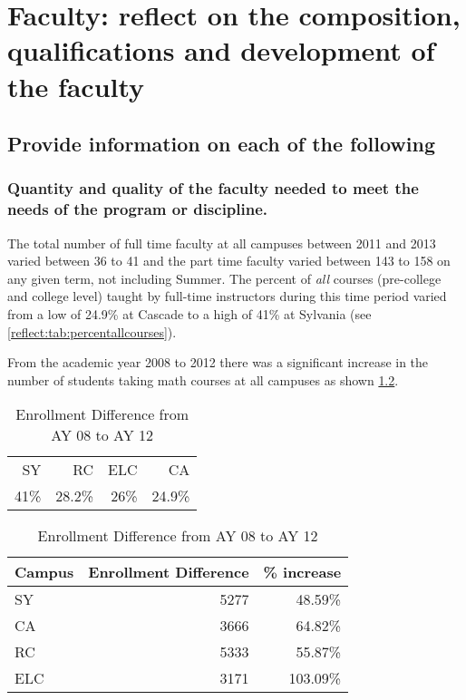 \chapter[Faculty composition and qualifications]{Faculty:  reflect on the composition, qualifications and development of the faculty}
\section{Provide information on each of the following}
\subsection{Quantity and quality of the faculty needed to meet the needs of the program or discipline.}
The total number of full time faculty at all campuses between 2011 and 2013 varied between 36 to 41 and the 
part time faculty varied between 143 to 158 on any given term,  not including Summer.     The percent of \emph{all} courses (pre-college and college level) taught by full-time instructors during this time period varied from a low of 24.9\% at Cascade to a high of 41\% at Sylvania (see \cref{reflect:tab:percentallcourses}).

From the academic year 2008 to 2012 there was a significant increase in the number of students taking math courses at all campuses as shown \cref{reflect:tab:enrollment}. 
\begin{table}[!htb]
  \begin{widepage}
	\begin{minipage}[t]{.4\textwidth}
		\centering
		\caption{Percentage of courses taught by full-time faculty from Summer2011--2013}
		\label{reflect:tab:percentallcourses}
		\begin{tabular}{rrrr}
			\toprule
			SY   & RC     & ELC  & CA     \\    
			41\% & 28.2\% & 26\% & 24.9\% \\
			\bottomrule
		\end{tabular}
	\end{minipage}%
	\begin{minipage}[t]{.6\textwidth}
		\centering
		\caption{Enrollment Difference from AY 08 to AY 12}
        \label{reflect:tab:enrollment}
		\begin{tabular}{lrr}
          \toprule
			Campus & Enrollment Difference & \% increase \\
            \midrule
			SY     & 5277                  & 48.59\%     \\
			CA     & 3666                  & 64.82\%     \\
			RC     & 5333                  & 55.87\%     \\
			ELC    & 3171                  & 103.09\%    \\
            \bottomrule
		\end{tabular}
	\end{minipage}
  \end{widepage}
\end{table}

